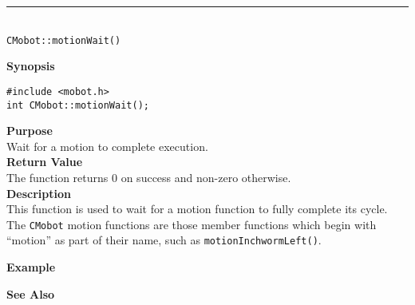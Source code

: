 \noindent
\vspace{5pt}
\rule{4.5in}{0.015in}\\
\noindent
{\LARGE \texttt{CMobot::motionWait()}}\\
{}

\noindent
{\bf Synopsis}
\begin{verbatim}
#include <mobot.h>
int CMobot::motionWait();
\end{verbatim}

\noindent
{\bf Purpose}\\
Wait for a motion to complete execution.\\

\noindent
{\bf Return Value}\\
The function returns 0 on success and non-zero otherwise.\\

\noindent
{\bf Description}\\
This function is used to wait for a motion function to fully complete its cycle.
The \texttt{CMobot} motion functions are those member functions which begin
with ``motion'' as part of their name, such as \texttt{motionInchwormLeft()}.


\noindent
{\bf Example}\\
\noindent

\noindent
{\bf See Also}\\

